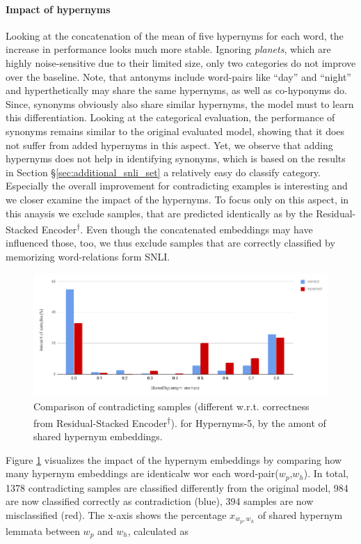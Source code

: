 \paragraph*{Impact of hypernyms}
Looking at the concatenation of the mean of five hypernyms for each word, the increase in performance looks much more stable. Ignoring \textit{planets}, which are highly noise-sensitive due to their limited size, only two categories do not improve over the baseline. Note, that antonyms include word-pairs like ``day'' and ``night'' and hyperthetically may share the same hypernyms, as well as co-hyponyms do. Since, synonyms obviously also share similar hypernyms, the model must to learn this differentiation. Looking at the categorical evaluation, the performance of synonyms remains similar to the original evaluated model, showing that it does not suffer from added hypernyms in this aspect. Yet, we observe that adding hypernyms does not help in identifying synonyms, which is based on the results in Section §\ref{sec:additional_snli_set} a relatively easy do classify category. Especially the overall improvement for contradicting examples is interesting and we closer examine the impact of the hypernyms. To focus only on this aspect, in this anaysis we exclude samples, that are predicted identically as by the Residual-Stacked Encoder\textsuperscript{$\dagger$}. Even though the concatenated embeddings may have influenced those, too, we thus exclude samples that are correctly classified by memorizing word-relations form \ac{SNLI}. 
\begin{figure}[tph!]
\centering
	\includegraphics[totalheight=5.5cm]{fig/analyse_hypern5.png}
	\caption{Comparison of contradicting samples (different w.r.t. correctness from Residual-Stacked Encoder\textsuperscript{$\dagger$}). for Hypernyms-5, by the amont of shared hypernym embeddings.}
	\label{fig:analyse_hypern5}
\end{figure}
Figure \ref{fig:analyse_hypern5} visualizes the impact of the hypernym embeddings by comparing how many hypernym embeddings are identicalw wor each word-pair($w_p$,$w_h$). In total, 1378 contradicting samples are classified differently from the original model, 984 are now classified correctly as contradiction (blue), 394 samples are now misclassified (red). The x-axis shows the percentage $x_{w_p,w_h}$ of shared hypernym lemmata between $w_p$ and $w_h$, calculated as 
